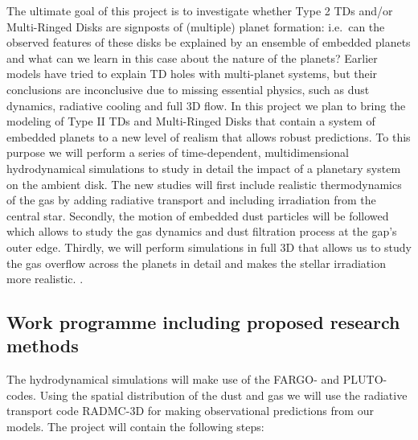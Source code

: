 \documentclass[10pt,fleqn,twoside]{article}
\begin{document}
The ultimate goal of this project is to investigate whether Type 2 TDs 
and/or Multi-Ringed Disks are signposts of (multiple) planet formation: 
i.e.\ can the observed features of these disks
be explained by an ensemble of embedded planets and what can we learn in this case about the nature
of the planets?
Earlier models have tried to explain TD holes with multi-planet systems, but their
conclusions are inconclusive due to missing essential physics, such as dust dynamics, radiative cooling and
full 3D flow.
In this project we plan to bring the modeling of Type II TDs and Multi-Ringed Disks 
that contain a system of embedded planets to a new level of realism
that allows robust predictions.
To this purpose we will perform a series of time-dependent, multidimensional hydrodynamical simulations to study in detail the impact of
a planetary system on the ambient disk. The new studies will first include realistic thermodynamics of the gas by adding radiative transport
and including irradiation from the central star. Secondly, the motion of embedded dust particles will be followed
which allows to study the gas dynamics and dust filtration process at the gap's outer edge.
Thirdly, we will perform simulations in full 3D that allows us to study the gas overflow
across the planets in detail and makes the stellar irradiation more realistic.
.


\subsection{Work programme including proposed research methods}

%
The hydrodynamical simulations will make use of the FARGO- and {PLUTO}-codes.
Using the spatial distribution of the dust and gas we will use the radiative transport
code RADMC-3D for making observational predictions from our models.
The project will contain the following steps:
\end{document}
